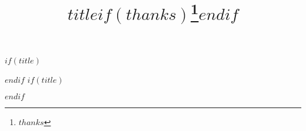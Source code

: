 $if(title)$
\title{$title$$if(thanks)$\thanks{$thanks$}$endif$}
$endif$
$if(title)$
\maketitle
$endif$
